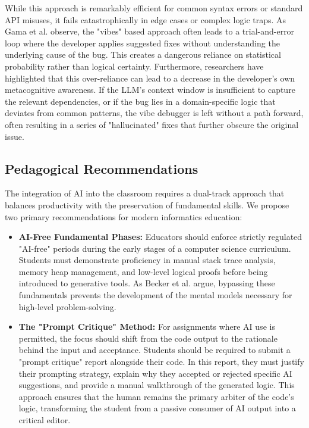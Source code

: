 \documentclass[../tanulmany.tex]{subfiles}
\begin{document}
While this approach is remarkably efficient for common syntax errors or standard API misuses, it fails catastrophically in edge cases or complex logic traps. As Gama et al. \cite{gama2025can} observe, the "vibes" based approach often leads to a trial-and-error loop where the developer applies suggested fixes without understanding the underlying cause of the bug. This creates a dangerous reliance on statistical probability rather than logical certainty. Furthermore, researchers have highlighted that this over-reliance can lead to a decrease in the developer's own metacognitive awareness. \cite{tankelevitch2024metacognitive} If the LLM’s context window is insufficient to capture the relevant dependencies, or if the bug lies in a domain-specific logic that deviates from common patterns, the vibe debugger is left without a path forward, often resulting in a series of "hallucinated" fixes that further obscure the original issue.

\subsection{Pedagogical Recommendations}

The integration of AI into the classroom requires a dual-track approach that balances productivity with the preservation of fundamental skills. We propose two primary recommendations for modern informatics education:

\begin{itemize}
    \item \textbf{AI-Free Fundamental Phases:} 
          Educators should enforce strictly regulated "AI-free" periods during the early stages of a computer science curriculum. 
          Students must demonstrate proficiency in manual stack trace analysis, memory heap management, and low-level logical proofs before being introduced to generative tools. 
          As Becker et al. \cite{becker2023programming} argue, bypassing these fundamentals prevents the development of the mental models necessary for high-level problem-solving.
    
    \item \textbf{The "Prompt Critique" Method:} 
          For assignments where AI use is permitted, the focus should shift from the code output to the rationale behind the input and acceptance. 
          Students should be required to submit a "prompt critique" report alongside their code. 
          In this report, they must justify their prompting strategy, explain why they accepted or rejected specific AI suggestions, and provide a manual walkthrough of the generated logic. 
          This approach ensures that the human remains the primary arbiter of the code's logic, transforming the student from a passive consumer of AI output into a critical editor. \cite{bucinca2021trust}
\end{itemize}
\end{document}
